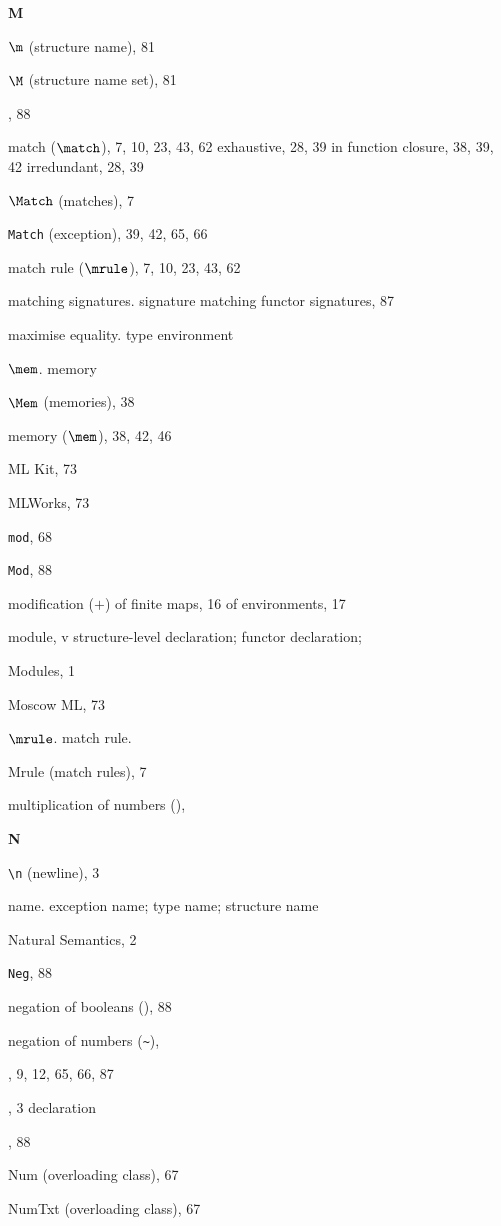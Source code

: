 \begin{theindex}
\parbox{64mm}{\hfil{\large\bf M}\hfil}

\indexspace

\item $\m$ (structure name), 81
\item $\M$ (structure name set), 81
\item {}, 88
\item match ($\match$), 7, 10, 23, 43, 62
\subitem exhaustive, 28, 39
\subitem in function closure, 38, 39, 42
\subitem irredundant, 28, 39
\item $\Match$ (matches), 7
\item {\tt Match} (exception), 39, 42, 65, 66
\item match rule ($\mrule$), 7, 10, 23, 43, 62
\item matching
\subitem signatures. \see signature matching
\subitem functor signatures, 87
\item maximise equality. \see type environment
\item $\mem$. \see memory
\item $\Mem$ (memories), 38
\item memory ($\mem$), 38, 42, 46
\item ML Kit, 73
\item MLWorks, 73
\item {\tt mod}, 68
\item {\tt Mod}, 88
\item modification ($+$)
\subitem of finite maps, 16
\subitem of environments, 17
\item module, v
\subitem \seealso structure-level declaration; functor declaration;
\item Modules, 1
\item Moscow ML, 73
\item $\mrule$.  \see match rule.
\item Mrule (match rules), 7
\item multiplication of numbers (\ml{*}), \mulrefs
\indexspace

\parbox{64mm}{\hfil{\large\bf N}\hfil}

\indexspace
\item \verb+\n+ (newline), 3
\item name. \see exception name; type name; structure name
\item Natural Semantics, 2
\item {\tt Neg}, 88
\item negation of booleans (), 88
\item negation of numbers (\verb+~+), \unaryminusrefs
\item \NIL, 9, 12, 65, 66, 87
\item \NONFIX, 3
\subitem \seealso declaration
\item {}, 88
\item Num (overloading class), 67
\item NumTxt (overloading class), 67
\indexspace


\end{theindex}
